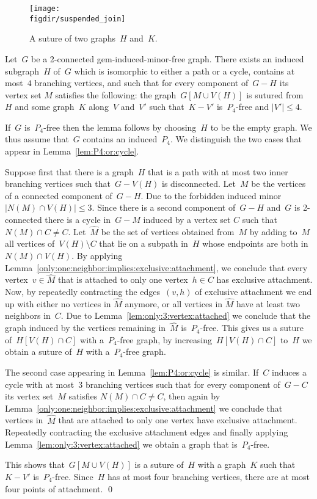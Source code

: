 \documentclass[envcountsame,envcountsect,11pt,a4paper]{llncs}
\renewenvironment{proof}{\begin{Proof}}{\qed\end{Proof}}
\newcommand{\figdir}{.}
\begin{document}
\begin{figure}[htb]
  \centering
  \texttt{[image: \\figdir/suspended\_join]}
  \caption{A suture of two graphs~$H$ and~$K$.}
  \label{fig:suture}
\end{figure}

\begin{lemma}
\label{lem:cycle:or:path:with:nice:attachemenst}
Let~$G$ be a 2-connected gem-induced-minor-free graph. There exists an induced subgraph~$H$ of~$G$ which is isomorphic to either a path or a cycle, contains at most~$4$ branching vertices,
and such that for every component of~$G-H$ its vertex set $M$ satisfies the following:
the graph~$G[M \cup V(H)]$ is sutured from~$H$ and some graph~$K$ along~$V$ and~$V'$ such that~$K - V'$ is~$P_4$-free and $|V'|\leq 4$. 
\end{lemma}
\begin{proof}
If~$G$ is~$P_4$-free then the lemma follows by choosing~$H$ to be the empty graph.
We thus assume that~$G$ contains an induced~$P_4$.
We distinguish the two cases that appear in Lemma~\ref{lem:P4:or:cycle}.

Suppose first that there is a graph~$H$ that is a path with at most
two inner branching vertices such that~$G-V(H)$ is disconnected. Let~$M$ be the vertices of a  connected component of~$G-H$.
Due to the forbidden induced minor~$|N(M) \cap V(H)| \leq 3$.
Since there is a second component of~$G-H$ and~$G$ is 2-connected there is a cycle in~$G - M$ induced by a vertex set $C$ such that~$N(M) \cap C \ne C$.
Let~$\widehat{M}$ be the set of vertices obtained from~$M$ by adding to~$M$ all vertices of~$V(H)\setminus C$ that lie on a subpath in~$H$ whose endpoints are both in~$N(M)\cap V(H)$.
By applying Lemma~\ref{only:one:neighbor:implies:exclusive:attachment}, we conclude that every vertex~$v\in \widehat{M}$ that is attached to only one vertex~$h\in C$ has
exclusive attachment.
Now, by repeatedly contracting the edges~$(v,h)$ of exclusive attachment we end up with either
no vertices in $\widehat{M}$ anymore, or all vertices in $\widehat{M}$ have at least two neighbors in~$C$.
Due to Lemma~\ref{lem:only:3:vertex:attached} we conclude that the graph induced by the vertices remaining in~$\widehat{M}$ is~$P_4$-free.
This gives us a suture of~$H[V(H) \cap C]$ with a~$P_4$-free graph, by increasing~$H[V(H) \cap C]$ to~$H$ we obtain a suture of~$H$ with a~$P_4$-free graph.

The second case appearing in Lemma~\ref{lem:P4:or:cycle} is similar. If~$C$ induces a cycle with at most~$3$ branching vertices such that for
every component of~$G-C$ its vertex set~$M$ satisfies $N(M)\cap C \neq C$, then again by Lemma~\ref{only:one:neighbor:implies:exclusive:attachment} we
conclude that vertices in~$\widehat{M}$ that are attached to only one vertex have exclusive attachment. Repeatedly contracting the exclusive
attachment edges and finally applying Lemma~\ref{lem:only:3:vertex:attached} we obtain a graph that is~$P_4$-free.

This shows that~$G[M \cup V(H)]$ is a suture of~$H$ with a graph~$K$ such that~$K - V'$ is~$P_4$-free. Since~$H$ has at most four
branching vertices, there are at most four points of attachment.
\end{proof}
\end{document}
